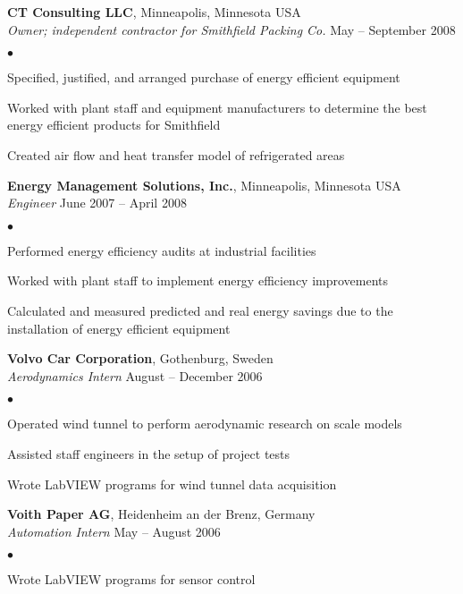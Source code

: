 \documentclass[margin,line,10pt]{res}
\newenvironment{list2}{
  \begin{list}{$\bullet$}{%
      \setlength{\itemsep}{0in}
      \setlength{\parsep}{0in} \setlength{\parskip}{0in}
      \setlength{\topsep}{0in} \setlength{\partopsep}{0in} 
      \setlength{\leftmargin}{0.2in}}}{\end{list}}
\begin{document}
\begin{resume}
{\bf CT Consulting LLC}, Minneapolis, Minnesota USA\\
\vspace{-.3cm}
{\em Owner; independent contractor for Smithfield Packing Co.} \hfill May -- September 2008\\
\begin{list2}
\item Specified, justified, and arranged purchase of energy efficient equipment
\item Worked with plant staff and equipment manufacturers to determine the best energy efficient  products for Smithfield
\item Created air flow and heat transfer model of refrigerated areas
\end{list2}

\vspace*{-.1in}

{\bf Energy Management Solutions, Inc.}, Minneapolis, Minnesota USA\\
\vspace{-.3cm}
{\em Engineer} \hfill June 2007 -- April 2008\\
\begin{list2}
\item Performed energy efficiency audits at industrial facilities
\item Worked with plant staff to implement energy efficiency improvements
\item Calculated and measured predicted and real energy savings due to the installation of energy efficient equipment
\end{list2}

\vspace*{-.1in}

{\bf Volvo Car Corporation}, Gothenburg, Sweden\\
\vspace{-.3cm}
{\em Aerodynamics Intern} \hfill August -- December 2006\\
\begin{list2}
\item Operated wind tunnel to perform aerodynamic research on scale models
\item Assisted staff engineers in the setup of project tests
\item Wrote LabVIEW programs for wind tunnel data acquisition
\end{list2}

\vspace*{-.1in}

{\bf Voith Paper AG}, Heidenheim an der Brenz, Germany\\
\vspace{-.3cm}
{\em Automation Intern} \hfill May -- August 2006\\
\begin{list2}
\item Wrote LabVIEW programs for sensor control
\end{list2}



\end{resume}
\end{document}
